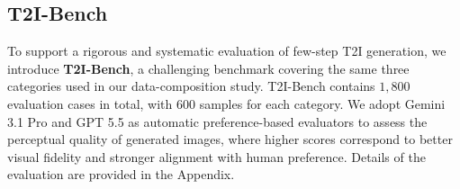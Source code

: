 \documentclass{article}
\begin{document}
\subsection{T2I-Bench}
\label{sec:exp_setup}
To support a rigorous and systematic evaluation of few-step T2I generation, we introduce \textbf{T2I-Bench}, a challenging benchmark covering the same three categories used in our data-composition study. T2I-Bench contains $1{,}800$ evaluation cases in total, with $600$ samples for each category. We adopt Gemini 3.1 Pro and GPT 5.5 as automatic preference-based evaluators to assess the perceptual quality of generated images, where higher scores correspond to better visual fidelity and stronger alignment with human preference. Details of the evaluation are provided in the Appendix.
\end{document}
